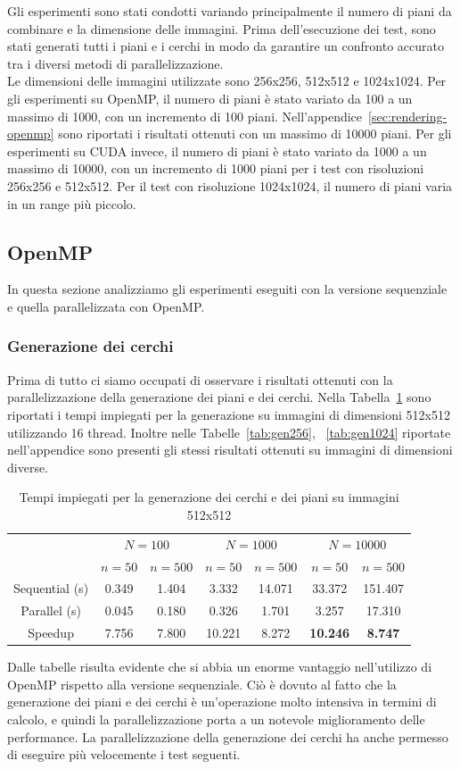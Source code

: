 Gli esperimenti sono stati condotti variando principalmente il numero di piani da combinare e la dimensione delle immagini.
Prima dell'esecuzione dei test, sono stati generati tutti i piani e i cerchi in modo da garantire un confronto accurato
tra i diversi metodi di parallelizzazione.\\
Le dimensioni delle immagini utilizzate sono 256x256, 512x512 e 1024x1024.
Per gli esperimenti su OpenMP, il numero di piani è stato variato da 100 a un massimo di 1000,
con un incremento di 100 piani.
Nell'appendice~\ref{sec:rendering-openmp} sono riportati i risultati ottenuti con un massimo di 10000 piani.
Per gli esperimenti su CUDA invece, il numero di piani è stato variato da 1000 a un massimo di 10000,
con un incremento di 1000 piani per i test con risoluzioni 256x256 e 512x512.
Per il test con risoluzione 1024x1024, il numero di piani varia in un range più piccolo.

\subsection{OpenMP}\label{subsec:test_openmp}
In questa sezione analizziamo gli esperimenti eseguiti con la versione sequenziale e quella parallelizzata con OpenMP.
\subsubsection{Generazione dei cerchi}
Prima di tutto ci siamo occupati di osservare i risultati ottenuti con la parallelizzazione della generazione dei piani e dei cerchi.
Nella Tabella~\ref{tab:gen512} sono riportati i tempi impiegati per la generazione su immagini di dimensioni 512x512 utilizzando 16 thread.
Inoltre nelle Tabelle~\ref{tab:gen256}, ~\ref{tab:gen1024} riportate nell'appendice sono presenti gli stessi risultati ottenuti su immagini di dimensioni diverse.
\begin{table}[H]
    \centering
    \begin{tabular}{c|c|c|c|c|c|c|}
        & \multicolumn{2}{|c|}{$N = 100$} & \multicolumn{2}{|c|}{$N = 1000$} & \multicolumn{2}{|c|}{$N = 10000$} \\
        & $n=50$ & $n=500$ & $n=50$ & $n=500$ & $n=50$ & $n=500$ \\
        \hline
        Sequential (s) & 0.349 & 1.404 & 3.332 & 14.071 & 33.372 & 151.407 \\
        Parallel (s) & 0.045 & 0.180 & 0.326 & 1.701 & 3.257 & 17.310 \\
        Speedup & 7.756 & 7.800 & 10.221 & 8.272 & \textbf{10.246} & \textbf{8.747} \\
    \end{tabular}
    \caption{\label{tab:gen512}Tempi impiegati per la generazione dei cerchi e dei piani su immagini 512x512}
\end{table}
Dalle tabelle risulta evidente che si abbia un enorme vantaggio nell'utilizzo di OpenMP rispetto alla versione sequenziale.
Ciò è dovuto al fatto che la generazione dei piani e dei cerchi è un'operazione molto intensiva in termini di calcolo,
e quindi la parallelizzazione porta a un notevole miglioramento delle performance.
La parallelizzazione della generazione dei cerchi ha anche permesso di eseguire più velocemente i test seguenti.

